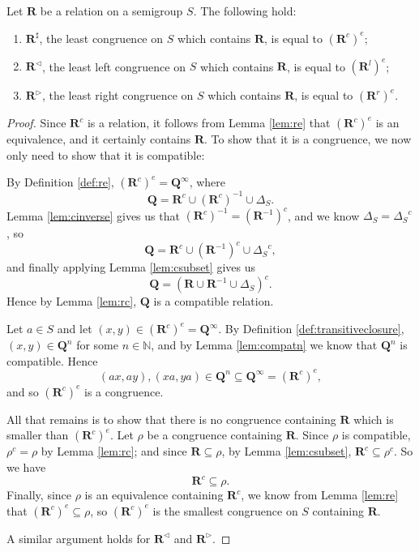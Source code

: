 \begin{theorem}
  \label{thm:rsharp}
  Let $\mathbf{R}$ be a relation on a semigroup $S$.
  The following hold:
  \begin{enumerate}[\rm(i)]
  \item $\mathbf{R}^\sharp$, the least congruence on $S$ which contains
    $\mathbf{R}$, is equal to $(\mathbf{R}^c)^e$;
  \item $\mathbf{R}^\triangleleft$, the least left congruence on $S$ which
    contains $\mathbf{R}$, is equal to $(\mathbf{R}^l)^e$;
  \item $\mathbf{R}^\triangleright$, the least right congruence on $S$ which
    contains $\mathbf{R}$, is equal to $(\mathbf{R}^r)^e$.
  \end{enumerate}
  \begin{proof}
    Since $\mathbf{R}^c$ is a relation, it follows from Lemma \ref{lem:re} that
    $(\mathbf{R}^c)^e$ is an equivalence, and it certainly contains
    $\mathbf{R}$.  To show that it is a congruence, we now only need to show
    that it is compatible:

    By Definition \ref{def:re}, $(\mathbf{R}^c)^e = \mathbf{Q}^\infty$, where
    $$\mathbf{Q} =
    \mathbf{R}^c \cup
    (\mathbf{R}^c)^{-1} \cup
    \Delta_S.$$
    Lemma \ref{lem:cinverse} gives us that
    $(\mathbf{R}^c)^{-1} = (\mathbf{R}^{-1})^c$, and
    we know
    $\Delta_S = {\Delta_S}^c$, so
    $$\mathbf{Q} =
    \mathbf{R}^c \cup
    (\mathbf{R}^{-1})^c \cup
    {\Delta_S}^c,$$
    and finally applying Lemma \ref{lem:csubset} gives us
    $$\mathbf{Q} =
    (\mathbf{R} \cup \mathbf{R}^{-1} \cup \Delta_S)^c.$$
    Hence by Lemma \ref{lem:rc}, $\mathbf{Q}$ is a compatible relation.

    Let $a \in S$ and let $(x,y) \in (\mathbf{R}^c)^e = \mathbf{Q}^\infty$.
    By Definition \ref{def:transitiveclosure}, $(x,y) \in \mathbf{Q}^n$ for some
    $n \in \mathbb{N}$, and by Lemma \ref{lem:compatn} we know that
    $\mathbf{Q}^n$ is compatible.  Hence
    $$(ax,ay), (xa, ya) \in \mathbf{Q}^n \subseteq \mathbf{Q}^\infty =
    (\mathbf{R}^c)^e,$$ and so $(\mathbf{R}^c)^e$ is a congruence.

    All that remains is to show that there is no congruence containing
    $\mathbf{R}$ which is smaller than $(\mathbf{R}^c)^e$.
    Let $\rho$ be a congruence containing $\mathbf{R}$.  Since $\rho$ is
    compatible, $\rho^c = \rho$ by Lemma \ref{lem:rc}; and since $\mathbf{R}
    \subseteq \rho$, by Lemma \ref{lem:csubset}, $\mathbf{R}^c \subseteq
    \rho^c$.  So we have
    $$\mathbf{R}^c \subseteq \rho.$$
    Finally, since $\rho$ is an equivalence containing $\mathbf{R}^c$, we know
    from Lemma \ref{lem:re} that $(\mathbf{R}^c)^e \subseteq \rho$, so
    $(\mathbf{R}^c)^e$ is the smallest congruence on $S$ containing
    $\mathbf{R}$. \cite[\S1.5]{howie}

    A similar argument holds for $\mathbf{R}^\triangleleft$ and
    $\mathbf{R}^\triangleright$.
  \end{proof}
\end{theorem}

